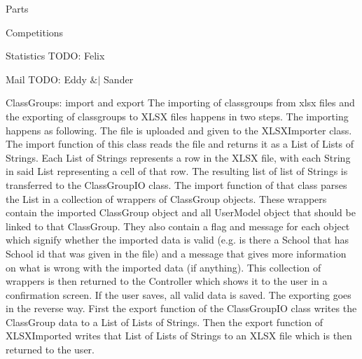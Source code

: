 \documentclass[]{article}
\begin{document}
\begin{section}{Parts}
\begin{subsection}{Competitions}
    \end{subsection}
    \begin{subsection}{Statistics}
        TODO: Felix
    \end{subsection}
    \begin{subsection}{Mail}
        TODO: Eddy $\&|$ Sander
    \end{subsection}
    \begin{subsection}{ClassGroups: import and export}
    	The importing of classgroups from xlsx files and the exporting of classgroups to XLSX files happens in two 				steps. 
    	The importing happens as following. The file is uploaded and given to the XLSXImporter class. The 						import function of this class reads the file and returns it as a List of Lists of Strings. Each List of 					Strings represents a row in the XLSX file, with each String in said List representing a cell of that row. The 		resulting list of list of Strings is transferred to the ClassGroupIO class. The import function of that class 		parses the List in a collection of wrappers of ClassGroup objects. These wrappers contain the imported 					ClassGroup object and all UserModel object that should be linked to that ClassGroup. They also contain a 				flag and message for each object which signify whether the imported data is valid (e.g. is there a School 				that has School id that was given in the file) and a message that gives more information on what is wrong 				with the imported data (if anything). This collection of wrappers is then returned to the Controller which 				shows it to the user in a confirmation screen. If the user saves, all valid data is saved.
    	The exporting goes in the reverse way. First the export function of the ClassGroupIO class writes the 					ClassGroup data to a List of Lists of Strings. Then the export function of XLSXImported writes that List of 				Lists of Strings to an XLSX file which is then returned to the user.
        

\end{subsection}
\end{section}
\end{document}
